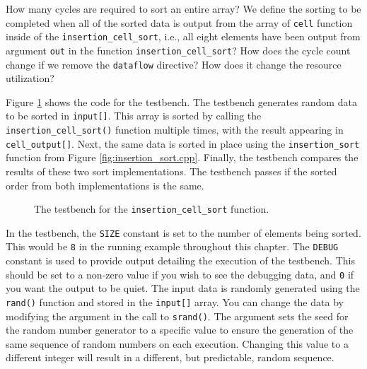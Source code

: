 \begin{exercise}
How many cycles are required to sort an entire array? We define the sorting to be completed when all of the sorted data is output from the array of \lstinline{cell} function inside of the \lstinline{insertion_cell_sort}, i.e., all eight elements have been output from argument \lstinline{out} in the function \lstinline{insertion_cell_sort}? How does the cycle count change if we remove the \lstinline{dataflow} directive? How does it change the resource utilization?
\end{exercise}

Figure \ref{fig:insertion_cell_sort_test.cpp} shows the code for the testbench. The testbench generates random data to be sorted in \lstinline{input[]}. This array is sorted by calling the \lstinline{insertion_cell_sort()} function multiple times, with the result appearing in \lstinline{cell_output[]}. Next, the same data is sorted in place using the \lstinline{insertion_sort} function from Figure \ref{fig:insertion_sort.cpp}. Finally, the testbench compares the results of these two sort implementations. The testbench passes if the sorted order from both implementations is the same.

\begin{figure}
\footnotesize
%
\caption{  The testbench for the \lstinline{insertion_cell_sort} function. }
\label{fig:insertion_cell_sort_test.cpp}
\end{figure}

In the testbench, the \lstinline{SIZE} constant is set to the number of elements being sorted. This would be \lstinline{8} in the running example throughout this chapter. The \lstinline{DEBUG} constant is used to provide output detailing the execution of the testbench. This should be set to a non-zero value if you wish to see the debugging data, and \lstinline{0} if you want the output to be quiet. The input data is randomly generated using the \lstinline{rand()} function and stored in the \lstinline{input[]} array. You can change the data by modifying the argument in the call to \lstinline{srand()}.  The argument sets the seed for the random number generator to a specific value to ensure the generation of the same sequence of random numbers on each execution.  Changing this value to a different integer will result in a different, but predictable, random sequence.


